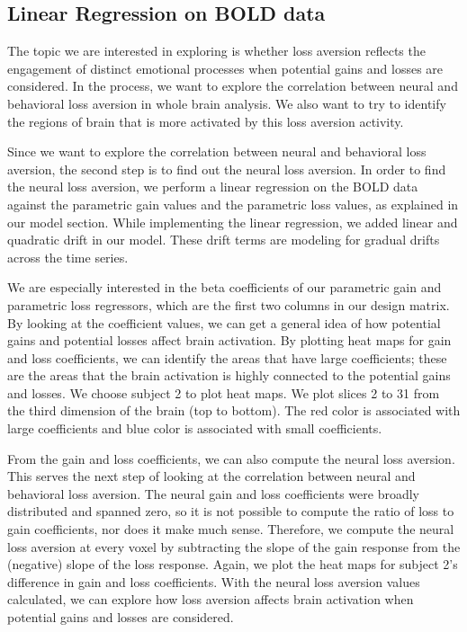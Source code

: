 \subsection{Linear Regression on BOLD data}

The topic we are interested in exploring is whether loss aversion reflects 
the engagement of distinct emotional processes when potential gains and 
losses are considered. In the process, we want to explore the correlation 
between neural and behavioral loss aversion in whole brain analysis. We also 
want to try to identify the regions of brain that is more activated by this 
loss aversion activity.

Since we want to explore the correlation between neural and behavioral loss 
aversion, the second step is to find out the neural loss aversion. In order 
to find the neural loss aversion, we perform a linear regression on the BOLD 
data against the parametric gain values and the parametric loss values, as 
explained in our model section. While implementing the linear regression, we 
added linear and quadratic drift in our model. These drift terms are modeling 
for gradual drifts across the time series.

We are especially interested in the beta coefficients of our parametric gain 
and parametric loss regressors, which are the first two columns in our design 
matrix. By looking at the coefficient values, we can get a general idea of 
how potential gains and potential losses affect brain activation. By plotting 
heat maps for gain and loss coefficients, we can identify the areas that have 
large coefficients; these are the areas that the brain activation is highly 
connected to the potential gains and losses. We choose subject 2 to plot heat 
maps. We plot slices 2 to 31 from the third dimension of the brain (top to 
bottom). The red color is associated with large coefficients and blue color 
is associated with small coefficients.

From the gain and loss coefficients, we can also compute the neural loss 
aversion. This serves the next step of looking at the correlation between 
neural and behavioral loss aversion. The neural gain and loss coefficients 
were broadly distributed and spanned zero, so it is not possible to compute 
the ratio of loss to gain coefficients, nor does it make much sense. 
Therefore, we compute the neural loss aversion at every voxel by subtracting 
the slope of the gain response from the (negative) slope of the loss response. 
Again, we plot the heat maps for subject 2’s difference in gain and loss 
coefficients. With the neural loss aversion values calculated, we can explore 
how loss aversion affects brain activation when potential gains and losses are 
considered.

